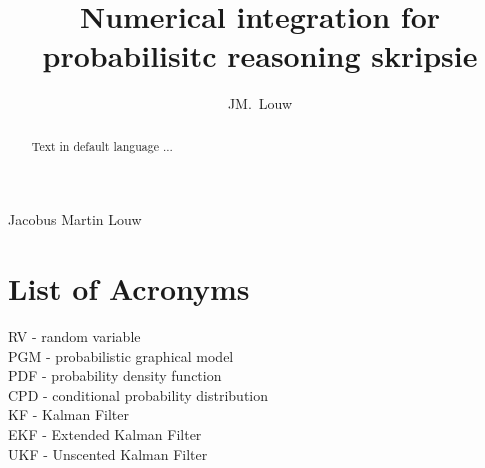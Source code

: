 \documentclass[12pt,oneside,openany,a4paper, %
afrikaans,english,
]{memoir}
\numberwithin{equation}{chapter}
\newcommand*{\WaterMark}[2][0.15\paperwidth]{%
\AddToShipoutPicture*{\AtTextCenter{%
\parbox[c]{0pt}{\makebox[0pt][c]{%
\texttt{[image: \#2]}}}}}}
\begin{document}
\pagestyle{plain}
\frontmatter
\title{Numerical integration for probabilisitc reasoning skripsie}
\author{JM.\ Louw}{Jacobus Martin Louw}
\frontmatter
\WaterMark{UScrest-WM}
\TitlePage

\DeclarationPage

\address{Department of Electrical and Electronic Engineering,\\
University of Stellenbosch,\\
Private Bag X1, 7602 Matieland, South Africa.}
\newpage

\tableofcontents
{}
\pagebreak
\listoffigures

\chapter{List of Acronyms}
RV -	random variable\\
PGM		-	probabilistic graphical model\\
PDF		-	probability density function\\
CPD		-	conditional probability distribution\\
KF		-	Kalman Filter\\
EKF		-	Extended Kalman Filter\\
UKF		-	Unscented Kalman Filter\\

\begin{abstract}
Text in default language ...
\end{abstract}


\mainmatter
\end{document}
